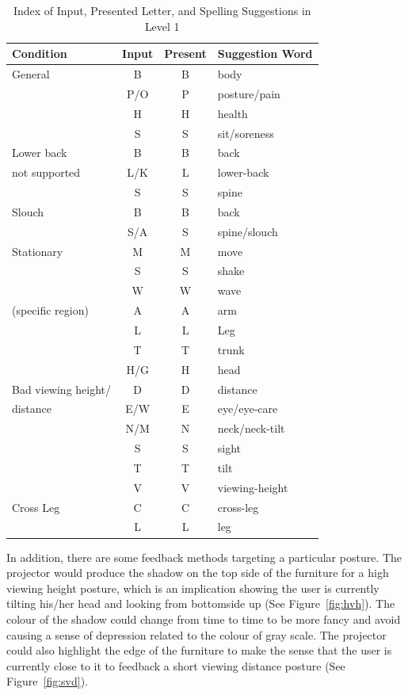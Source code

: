 \begin{table}
\centering
\begin{tabular}{l c c l} 
\hline\hline
Condition & Input & Present & Suggestion Word\\
\hline\hline
General & B & B & body\\
  & P/O & P & posture/pain\\
  & H & H & health\\
  & S & S & sit/soreness\\
\hline
Lower back & B & B & back\\
not supported & L/K & L & lower-back\\
  & S & S & spine\\
\hline
 Slouch & B & B & back\\
  & S/A & S & spine/slouch\\
\hline
 Stationary & M & M & move\\
  & S & S & shake\\
  & W & W & wave\\
 (specific region) & A & A & arm\\
  & L & L & Leg\\ 
  & T & T & trunk\\
  & H/G & H & head\\
\hline
Bad viewing height/ & D & D & distance\\
distance  & E/W & E & eye/eye-care\\
  & N/M & N & neck/neck-tilt\\
  & S & S & sight\\
  & T & T & tilt\\
  & V & V & viewing-height\\
\hline
Cross Leg & C & C & cross-leg\\
  & L & L & leg\\
\hline\hline
\end{tabular}
\caption{Index of Input, Presented Letter, and Spelling Suggestions in Level 1}
\label{tab:input_letter_spelling_lvl1}
\end{table}

In addition, there are some feedback methods targeting a particular posture. The projector would produce the shadow on the top side of the furniture for a high viewing height posture, which is an implication showing the user is currently tilting his/her head and looking from bottomside up (See Figure~\ref{fig:hvh}). The colour of the shadow could change from time to time to be more fancy and avoid causing a sense of depression related to the colour of gray scale. The projector could also highlight the edge of the furniture to make the sense that the user is currently close to it to feedback a short viewing distance posture (See Figure~\ref{fig:svd}). 

